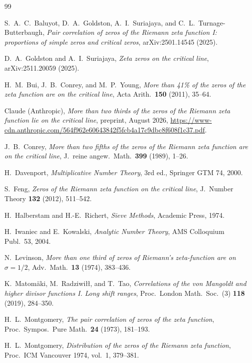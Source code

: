 \documentclass[11pt]{article}
\numberwithin{equation}{section}
\theoremstyle{definition}
\theoremstyle{remark}
\begin{document}
\begin{thebibliography}{99}

 S.~A.~C.~Baluyot, D.~A.~Goldston,
A.~I.~Suriajaya, and C.~L.~Turnage-Butterbaugh, \emph{Pair
correlation of zeros of the Riemann zeta function I: proportions
of simple zeros and critical zeros}, arXiv:2501.14545 (2025).

 D.~A.~Goldston and A.~I.~Suriajaya, \emph{Zeta zeros
on the critical line}, arXiv:2511.20059 (2025).

 H.~M.~Bui, J.~B.~Conrey, and M.~P.~Young,
\emph{More than 41\% of the zeros of the zeta function are on the
critical line}, Acta Arith.\ \textbf{150} (2011), 35--64.

 Claude (Anthropic), \emph{More than two thirds
of the zeros of the Riemann zeta function lie on the critical
line}, preprint, August 2026,
\url{https://www-cdn.anthropic.com/564f962e60643842f5fcb4a17c9dbc8f608f1c37.pdf}.

 J.~B.~Conrey, \emph{More than two fifths of the
zeros of the Riemann zeta function are on the critical line},
J.\ reine angew.\ Math.\ \textbf{399} (1989), 1--26.

 H.~Davenport, \emph{Multiplicative Number Theory},
3rd ed., Springer GTM 74, 2000.

 S.~Feng, \emph{Zeros of the Riemann zeta function
on the critical line}, J.\ Number Theory \textbf{132} (2012),
511--542.

 H.~Halberstam and H.-E.~Richert, \emph{Sieve
Methods}, Academic Press, 1974.

 H.~Iwaniec and E.~Kowalski, \emph{Analytic Number
Theory}, AMS Colloquium Publ.\ 53, 2004.

 N.~Levinson, \emph{More than one third of zeros
of Riemann's zeta-function are on $\sigma=1/2$}, Adv.\ Math.\
\textbf{13} (1974), 383--436.

 K.~Matom\"aki, M.~Radziwi\l{}\l, and T.~Tao,
\emph{Correlations of the von Mangoldt and higher divisor
functions I. Long shift ranges}, Proc.\ London Math.\ Soc.\ (3)
\textbf{118} (2019), 284--350.

 H.~L.~Montgomery, \emph{The pair correlation of
zeros of the zeta function}, Proc.\ Sympos.\ Pure Math.\
\textbf{24} (1973), 181--193.

 H.~L.~Montgomery, \emph{Distribution of the zeros
of the Riemann zeta function}, Proc.\ ICM Vancouver 1974, vol.~1,
379--381.


\end{thebibliography}
\end{document}
